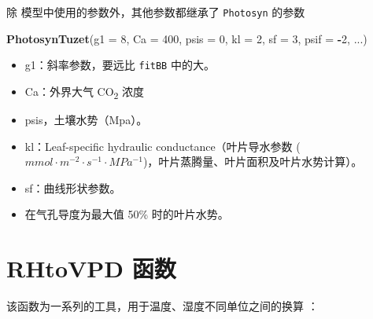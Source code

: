 \documentclass[]{krantz}
\makeatletter
\newenvironment{Shaded}{\begin{snugshade}}{\end{snugshade}}
\newcommand{\KeywordTok}[1]{\textcolor[rgb]{0.13,0.29,0.53}{\textbf{#1}}}
\newcommand{\DataTypeTok}[1]{\textcolor[rgb]{0.13,0.29,0.53}{#1}}
\newcommand{\DecValTok}[1]{\textcolor[rgb]{0.00,0.00,0.81}{#1}}
\newcommand{\OperatorTok}[1]{\textcolor[rgb]{0.81,0.36,0.00}{\textbf{#1}}}
\newcommand{\NormalTok}[1]{#1}
\providecommand{\tightlist}{%
  \setlength{\itemsep}{0pt}\setlength{\parskip}{0pt}}
\newenvironment{kframe}{%
\medskip{}
\setlength{\fboxsep}{.8em}
 \def\at@end@of@kframe{}%
 \ifinner\ifhmode%
  \def\at@end@of@kframe{\end{minipage}}%
  \begin{minipage}{\columnwidth}%
 \fi\fi%
 \def\FrameCommand##1{\hskip\@totalleftmargin \hskip-\fboxsep
 \colorbox{shadecolor}{##1}\hskip-\fboxsep
     \hskip-\linewidth \hskip-\@totalleftmargin \hskip\columnwidth}%
 \MakeFramed {\advance\hsize-\width
   \@totalleftmargin\z@ \linewidth\hsize
   \@setminipage}}%
 {\par\unskip\endMakeFramed%
 \at@end@of@kframe}
\renewenvironment{Shaded}{\begin{kframe}}{\end{kframe}}
\theoremstyle{definition}
\theoremstyle{definition}
\theoremstyle{definition}
\theoremstyle{remark}
\makeatother
\begin{document}
除 \citet{tuzet2003a} 模型中使用的参数外，其他参数都继承了
\texttt{Photosyn} 的参数

\begin{Shaded}
\begin{Highlighting}[]
\KeywordTok{PhotosynTuzet}\NormalTok{(}\DataTypeTok{g1 =} \DecValTok{8}\NormalTok{, }\DataTypeTok{Ca =} \DecValTok{400}\NormalTok{, }\DataTypeTok{psis =} \DecValTok{0}\NormalTok{,}
              \DataTypeTok{kl =} \DecValTok{2}\NormalTok{, }\DataTypeTok{sf =} \DecValTok{3}\NormalTok{, }\DataTypeTok{psif =} \OperatorTok{-}\DecValTok{2}\NormalTok{,}
\NormalTok{...)}
\end{Highlighting}
\end{Shaded}

\begin{itemize}
\tightlist
\item
  g1：斜率参数，要远比 \texttt{fitBB} 中的大。
\item
  Ca：外界大气 CO\textsubscript{2} 浓度
\item
  psis，土壤水势（Mpa）。
\item
  kl：Leaf-speciﬁc hydraulic conductance（叶片导水参数
  (\(mmol \cdot m^{-2} \cdot s^{-1} \cdot MPa^{-1}\))，叶片蒸腾量、叶片面积及叶片水势计算）。
\item
  sf：曲线形状参数。
\item
  在气孔导度为最大值 50\% 时的叶片水势。
\end{itemize}

\cleardoublepage

\chapter{RHtoVPD 函数}\label{rhtovpd-}

该函数为一系列的工具，用于温度、湿度不同单位之间的换算
\citet{Jones1993Plants} ：
\end{document}
